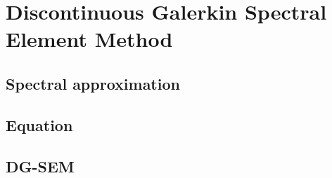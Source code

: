 \chapter{Discontinuous Galerkin Spectral Element Method} \label{chapter:spectral_element_method} 

\section{Spectral approximation} \label{section:spectral_element_method:spectral_approximation}

\section{Equation} \label{section:spectral_element_method:equation}

\section{DG-SEM} \label{section:spectral_element_method:dg_sem}
